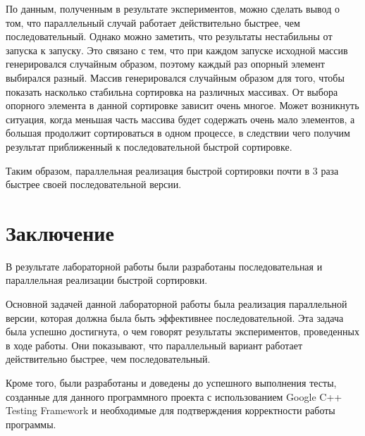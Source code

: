 \documentclass{report}
\begin{document}
\par По данным, полученным в результате экспериментов, можно сделать вывод о том, что параллельный случай работает действительно быстрее, чем последовательный. Однако можно заметить, что результаты нестабильны от запуска к запуску. Это связано с тем, что при каждом запуске исходной массив генерировался случайным образом, поэтому каждый раз опорный элемент выбирался разный. Массив генерировался случайным образом для того, чтобы показать насколько стабильна сортировка на различных массивах. От выбора опорного элемента в данной сортировке зависит очень многое. Может возникнуть ситуация, когда меньшая часть массива будет содержать очень мало элементов, а большая продолжит сортироваться в одном процессе, в следствии чего получим результат приближенный к последовательной быстрой сортировке. 
\par Таким образом, параллельная реализация быстрой сортировки почти в $3$ раза быстрее своей последовательной версии.
\newpage

\section*{Заключение}
В результате лабораторной работы были разработаны последовательная и параллельная реализации быстрой сортировки.
\par Основной задачей данной лабораторной работы была реализация параллельной версии, которая должна была быть эффективнее последовательной. Эта задача была успешно достигнута, о чем говорят результаты экспериментов, проведенных в ходе работы. Они показывают, что параллельный вариант работает действительно быстрее, чем последовательный.
\par Кроме того, были разработаны и доведены до успешного выполнения тесты, созданные для данного программного проекта с использованием Google C++ Testing Framework и необходимые для подтверждения корректности работы программы.
\newpage
\end{document}
